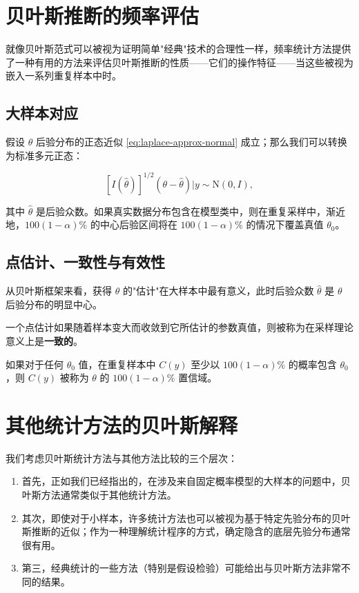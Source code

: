 \section{贝叶斯推断的频率评估}

就像贝叶斯范式可以被视为证明简单"经典"技术的合理性一样，频率统计方法提供了一种有用的方法来评估贝叶斯推断的性质——它们的操作特征——当这些被视为嵌入一系列重复样本中时。

\subsection{大样本对应}

假设 $\theta$ 后验分布的正态近似 \cref{eq:laplace-approx-normal} 成立；那么我们可以转换为标准多元正态：

\[
[I(\hat{\theta})]^{1/2}(\theta - \hat{\theta}) | y \sim \mathrm{N}(0, I), \label{eq:standard-normal-approx}
\]

其中 $\hat{\theta}$ 是后验众数。如果真实数据分布包含在模型类中，则在重复采样中，渐近地，$100(1-\alpha)\%$ 的中心后验区间将在 $100(1-\alpha)\%$ 的情况下覆盖真值 $\theta_0$。

\subsection{点估计、一致性与有效性}

从贝叶斯框架来看，获得 $\theta$ 的"估计"在大样本中最有意义，此时后验众数 $\hat{\theta}$ 是 $\theta$ 后验分布的明显中心。

一个点估计如果随着样本变大而收敛到它所估计的参数真值，则被称为在采样理论意义上是\textbf{一致的}。

如果对于任何 $\theta_0$ 值，在重复样本中 $C(y)$ 至少以 $100(1-\alpha)\%$ 的概率包含 $\theta_0$，则 $C(y)$ 被称为 $\theta$ 的 $100(1-\alpha)\%$ 置信域。

\section{其他统计方法的贝叶斯解释}

我们考虑贝叶斯统计方法与其他方法比较的三个层次：

\begin{enumerate}
  \item 首先，正如我们已经指出的，在涉及来自固定概率模型的大样本的问题中，贝叶斯方法通常类似于其他统计方法。
  \item 其次，即使对于小样本，许多统计方法也可以被视为基于特定先验分布的贝叶斯推断的近似；作为一种理解统计程序的方式，确定隐含的底层先验分布通常很有用。
  \item 第三，经典统计的一些方法（特别是假设检验）可能给出与贝叶斯方法非常不同的结果。
\end{enumerate}

